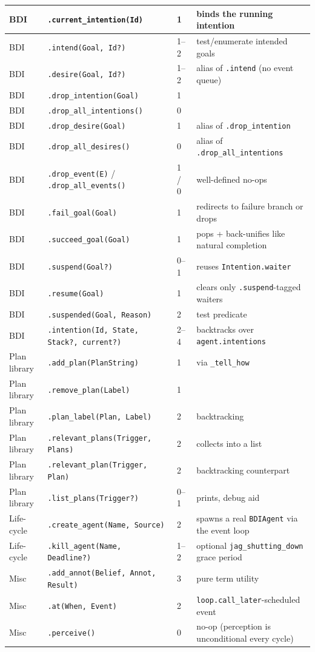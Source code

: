 \documentclass[11pt,a4paper]{article}
\newcommand{\ia}[1]{\texttt{#1}}
\begin{document}
\begin{footnotesize}
\begin{longtable}{|p{2.6cm}|p{5.2cm}|p{1.6cm}|p{6.0cm}|}
BDI & \ia{.current\_intention(Id)} & 1 & binds the running intention \\ \hline
BDI & \ia{.intend(Goal, Id?)} & 1--2 & test/enumerate intended goals \\ \hline
BDI & \ia{.desire(Goal, Id?)} & 1--2 & alias of \ia{.intend} (no event queue) \\ \hline
BDI & \ia{.drop\_intention(Goal)} & 1 & \\ \hline
BDI & \ia{.drop\_all\_intentions()} & 0 & \\ \hline
BDI & \ia{.drop\_desire(Goal)} & 1 & alias of \ia{.drop\_intention} \\ \hline
BDI & \ia{.drop\_all\_desires()} & 0 & alias of \ia{.drop\_all\_intentions} \\ \hline
BDI & \ia{.drop\_event(E)} / \ia{.drop\_all\_events()} & 1 / 0 & well-defined no-ops \\ \hline
BDI & \ia{.fail\_goal(Goal)} & 1 & redirects to failure branch or drops \\ \hline
BDI & \ia{.succeed\_goal(Goal)} & 1 & pops + back-unifies like natural completion \\ \hline
BDI & \ia{.suspend(Goal?)} & 0--1 & reuses \texttt{Intention.waiter} \\ \hline
BDI & \ia{.resume(Goal)} & 1 & clears only \ia{.suspend}-tagged waiters \\ \hline
BDI & \ia{.suspended(Goal, Reason)} & 2 & test predicate \\ \hline
BDI & \ia{.intention(Id, State, Stack?, current?)} & 2--4 & backtracks over \texttt{agent.intentions} \\ \hline
Plan library & \ia{.add\_plan(PlanString)} & 1 & via \texttt{\_tell\_how} \\ \hline
Plan library & \ia{.remove\_plan(Label)} & 1 & \\ \hline
Plan library & \ia{.plan\_label(Plan, Label)} & 2 & backtracking \\ \hline
Plan library & \ia{.relevant\_plans(Trigger, Plans)} & 2 & collects into a list \\ \hline
Plan library & \ia{.relevant\_plan(Trigger, Plan)} & 2 & backtracking counterpart \\ \hline
Plan library & \ia{.list\_plans(Trigger?)} & 0--1 & prints, debug aid \\ \hline
Life-cycle & \ia{.create\_agent(Name, Source)} & 2 & spawns a real \texttt{BDIAgent} via the event loop \\ \hline
Life-cycle & \ia{.kill\_agent(Name, Deadline?)} & 1--2 & optional \texttt{jag\_shutting\_down} grace period \\ \hline
Misc & \ia{.add\_annot(Belief, Annot, Result)} & 3 & pure term utility \\ \hline
Misc & \ia{.at(When, Event)} & 2 & \texttt{loop.call\_later}-scheduled event \\ \hline
Misc & \ia{.perceive()} & 0 & no-op (perception is unconditional every cycle) \\ \hline

\end{longtable}
\end{footnotesize}
\end{document}
